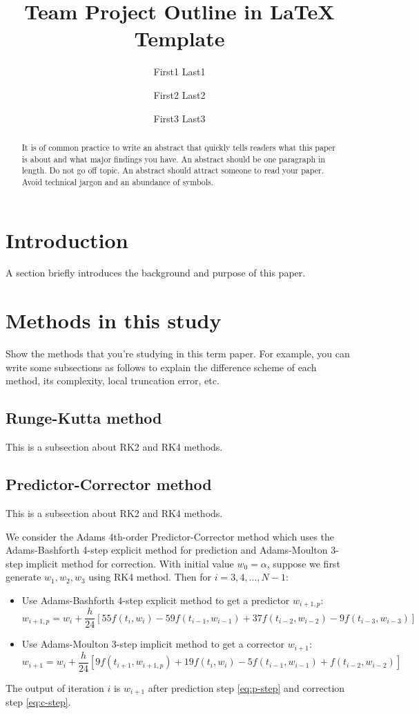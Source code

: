 \documentclass[11pt]{article}	%
\title{Team Project Outline in LaTeX Template}
\author{First1 Last1 \and First2 Last2 \and First3 Last3}
\date{} %
\begin{document}
\maketitle

\begin{abstract}
It is of common practice to write an abstract that quickly tells readers what
this paper is about and what major findings you have. 
An abstract should be one paragraph in length.
Do not go off topic. An abstract should attract someone to read your
paper. Avoid technical jargon and an abundance of symbols.
\end{abstract}

\section{Introduction}
A section briefly introduces the background and purpose of this paper.

\section{Methods in this study}
Show the methods that you're studying in this term paper.
For example, you can write some subsections as follows to 
explain the difference scheme of each method, its complexity, local truncation error, etc.

\subsection{Runge-Kutta method}
This is a subsection about RK2 and RK4 methods.

\subsection{Predictor-Corrector method}
This is a subsection about RK2 and RK4 methods.

We consider the Adams 4th-order Predictor-Corrector method
which uses the Adams-Bashforth 4-step explicit method for prediction and Adams-Moulton 3-step implicit
method for correction. With initial value $w_0=\alpha$, suppose we first generate $w_1,w_2,w_3$
using RK4 method. Then for $i=3,4,\dots,N-1$:
\begin{itemize}
\item Use Adams-Bashforth 4-step explicit method to get a predictor $w_{i+1,p}$:
\begin{equation}\label{eq:p-step}
w_{i+1,p} = w_i + \frac{h}{24} [ 55 f(t_i, w_i) - 59 f(t_{i-1}, w_{i-1}) + 37 f(t_{i-2}, w_{i-2}) - 9 f(t_{i-3},w_{i-3}) ]
\end{equation}
\item Use Adams-Moulton 3-step implicit method to get a corrector $w_{i+1}$:
\begin{equation}\label{eq:c-step}
w_{i+1} = w_i + \frac{h}{24} [ 9 f(t_{i+1},w_{i+1,p}) + 19 f(t_i, w_i) - 5 f(t_{i-1}, w_{i-1}) + f(t_{i-2}, w_{i-2}) ]
\end{equation}
\end{itemize}
The output of iteration $i$ is $w_{i+1}$ after prediction step \eqref{eq:p-step} and correction step \eqref{eq:c-step}.
\end{document}

